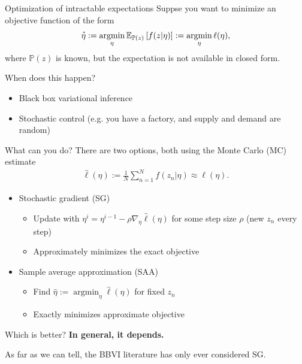 \documentclass[8pt]{beamer}\usepackage[]{graphicx}\usepackage[]{color}
\def\p#1{\mathbb{P}\left(#1\right)}
\def\z{z}
\def\etahat{\hat{\eta}}
\def\ellhat{\hat{\ell}}
\def\sumn{\sum_{n=1}^N}
\def\meann{\frac{1}{N} \sumn}
\newcommand{\etastar}{\accentset{*}{\eta}}
\def\expect#1#2{\mathbb{E}_{#1}\left[#2\right]}
\DeclareMathOperator*{\argmin}{\mathrm{argmin}}
\begin{document}
\begin{frame}{Optimization of intractable expectations}
%
Suppse you want to minimize an objective function of the form
%
\begin{align*}
%
\etastar :=  \argmin_{\eta} \expect{\p{\z}}{f(\z | \eta)}
:= \argmin_{\eta} \ell(\eta),
%
\end{align*}
%
where $\p{\z}$ is known, but the expectation is not available in closed form.

\pause
When does this happen?
%
\begin{itemize}
%
\item Black box variational inference
%
\item Stochastic control (e.g. you have a factory, and supply and demand are
random)
%
\end{itemize}
%
\pause What can you do?  There are two options, both using the Monte Carlo (MC)
estimate
%
\begin{align*}
%
\ellhat(\eta) := \meann f(z_n | \eta) \approx \ell(\eta).
%
\end{align*}
%
\pause
%
\begin{itemize}
%
\item Stochastic gradient (SG)
%
\begin{itemize}
%
\item Update with $\eta^{i} = \eta^{i-1} - \rho \nabla_\eta \ellhat(\eta)$
for some step size $\rho$ (new $\z_n$ every step)
\item Approximately minimizes the exact objective
%
\end{itemize}
%
\pause
\item Sample average approximation (SAA)
%
\begin{itemize}
%
\item Find $\etahat := \argmin_{\eta} \ellhat(\eta)$ for fixed $\z_n$
\item Exactly minimizes approximate objective
%
\end{itemize}
%
\end{itemize}
%
\pause
Which is better? \textbf{In general, it depends.}


As far as we can tell, the BBVI literature has only ever considered SG.
%
\end{frame}




\end{document}
